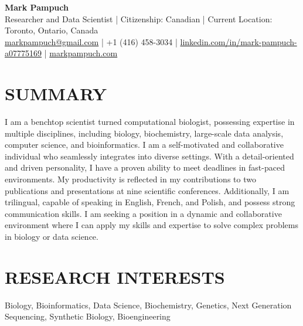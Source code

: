 \documentclass[a4paper,9pt]{extarticle}
\begin{document}
\pagestyle{fancy}
\renewcommand{\headrulewidth}{0pt}
\fancyhead{}
\thispagestyle{empty} %

\begin{flushleft}
	\textbf{\huge Mark Pampuch}\\[2pt] 
	Researcher and Data Scientist | Citizenship: Canadian | Current Location: Toronto, Ontario, Canada
	\\ \href{mailto:markpampuch@gmail.com}{markpampuch@gmail.com} | +1 (416) 458-3034 | \href{https://www.linkedin.com/in/mark-pampuch-a07775169/}{linkedin.com/in/mark-pampuch-a07775169} | \href{https://markpampuch.com}{markpampuch.com} 
\end{flushleft}

\section*{SUMMARY}
\noindent
I am a benchtop scientist turned computational biologist, possessing expertise in multiple disciplines, including biology, biochemistry, large-scale data analysis, computer science, and bioinformatics. I am a self-motivated and collaborative individual who seamlessly integrates into diverse settings. With a detail-oriented and driven personality, I have a proven ability to meet deadlines in fast-paced environments. My productivity is reflected in my contributions to two publications and presentations at nine scientific conferences. Additionally, I am trilingual, capable of speaking in English, French, and Polish, and possess strong communication skills. I am seeking a position in a dynamic and collaborative environment where I can apply my skills and expertise to solve complex problems in biology or data science.

\section*{RESEARCH INTERESTS}
\noindent
Biology, Bioinformatics, Data Science, Biochemistry, Genetics, Next Generation Sequencing, Synthetic Biology, Bioengineering

\end{document}
